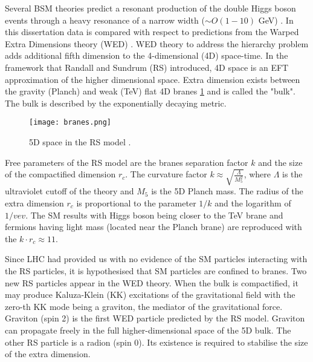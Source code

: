 Several BSM theories \cite{Huang:2017nnw, Dolan:2012ac, Kanemura:2016tan} predict a resonant production of the double Higgs boson events through a heavy resonance of a narrow width ($\sim O(1-10)$ GeV) \cite{Sirunyan:2018iwt}. In this dissertation data is compared with respect to predictions from the Warped Extra Dimensions theory (WED) \cite{Oliveira:2014kla}. WED theory to address the hierarchy problem adds additional fifth dimension to the 4-dimensional (4D) space-time. In the framework that Randall and Sundrum (RS) \cite{Randall:1999ee} introduced, 4D space is an EFT approximation of the higher dimensional space. Extra dimension exists between the gravity (Planch) and weak (TeV) flat 4D branes \ref{branes} and is called the "bulk". The bulk is described by the exponentially decaying metric. 



\begin{figure}[H]
\centering
\texttt{[image: branes.png]}
\caption[RS branes]{5D space in the RS model \cite{Xanda}.}
\label{branes}
\end{figure}




Free parameters of the RS model are the branes separation factor $k$ and the size of the compactified dimension $r_c$. The curvature factor $k \approx \sqrt{ \frac{\Lambda}{M^2_5}  }$, where $\Lambda$ is the ultraviolet cutoff of the theory and $M_5$ is the 5D Planch mass. The radius of the extra dimension $r_c$ is proportional to the parameter $1/k$ and the logarithm of $1/vev$. The SM results with Higgs boson being closer to the TeV brane and fermions having light mass (located near the Planch brane) are reproduced with the $k \cdot r_c \approx 11$. 



Since LHC had provided us with no evidence of the SM particles interacting with the RS particles, it is hypothesised that SM particles are confined to branes. Two new RS particles appear in the WED theory. When the bulk is compactified, it may produce Kaluza-Klein (KK) \cite{Uzawa:1999pg} excitations of the gravitational field with the zero-th KK mode being a graviton, the mediator of the gravitational force. Graviton (spin 2) is the first WED particle predicted by the RS model. Graviton can propagate freely in the full higher-dimensional space of the 5D bulk. %
The other RS particle is a radion (spin 0). Its existence is required to stabilise the size of the extra dimension. 





